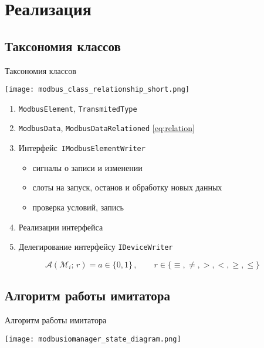 \section{Реализация}\subsection{Таксономия классов}
\begin{frame}{Таксономия классов}
    \vspace{-1mm}\hspace{-5mm}\begin{minipage}[c]{0.4\linewidth}
        \texttt{[image: modbus\_class\_relationship\_short.png]}
    \end{minipage}
    \hspace{25mm}\begin{minipage}[c]{0.4\linewidth}
    {\tiny\begin{enumerate}
        \item \texttt{ModbusElement}, \texttt{TransmitedType}
        \item \texttt{ModbusData}, \texttt{ModbusDataRelationed} \eqref{eq:relation}
        \item Интерфейс~\texttt{IModbusElementWriter}
        \begin{itemize}
            \item {\tiny сигналы о записи и изменении}
            \item {\tiny слоты на запуск, останов и обработку новых данных}
            \item {\tiny проверка условий, запись}
        \end{itemize}
        \item Реализации интерфейса
        \item Делегирование интерфейсу \texttt{IDeviceWriter}
    \end{enumerate}}
\end{minipage}
    \begin{equation}\label{eq:relation}
        \mathcal{A} \left(\mathcal{M}_i;\, r \right) = a \in \{0, 1\}\,, \qquad
        r \in \{\equiv,\ne,>,<,\ge,\le\}
    \end{equation}
\end{frame}





\subsection{Алгоритм работы имитатора}
\begin{frame}{Алгоритм работы имитатора}
    \begin{center}
        \texttt{[image: modbusiomanager\_state\_diagram.png]}
    \end{center}
\end{frame}






